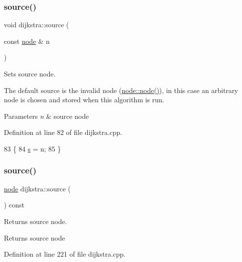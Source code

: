 \subsubsection{\texorpdfstring{source()}{source()}\hspace{0.1cm}{\footnotesize\ttfamily [1/2]}}
{\footnotesize\ttfamily void dijkstra\+::source (\begin{DoxyParamCaption}\item[{const \mbox{\hyperlink{classnode}{node}} \&}]{n }\end{DoxyParamCaption})}



Sets source node. 

The default source is the invalid node (\mbox{\hyperlink{classnode_a6da4ea35f222059db9a59cf40be459f9}{node\+::node()}}), in this case an arbitrary node is chosen and stored when this algorithm is run.


\begin{DoxyParams}{Parameters}
{\em n} & source node \\
\hline
\end{DoxyParams}


Definition at line 82 of file dijkstra.\+cpp.


\begin{DoxyCode}
83 \{
84     \mbox{\hyperlink{classdijkstra_a721bfb648626a1be2b9d276d85ebdb9d}{s}} = n;
85 \}
\end{DoxyCode}
\mbox{\label{classdijkstra_a69772d19321b5e4deac66174ec546caa}} 
\subsubsection{\texorpdfstring{source()}{source()}\hspace{0.1cm}{\footnotesize\ttfamily [2/2]}}
{\footnotesize\ttfamily \mbox{\hyperlink{classnode}{node}} dijkstra\+::source (\begin{DoxyParamCaption}{ }\end{DoxyParamCaption}) const}



Returns source node. 

\begin{DoxyReturn}{Returns}
source node 
\end{DoxyReturn}


Definition at line 221 of file dijkstra.\+cpp.


